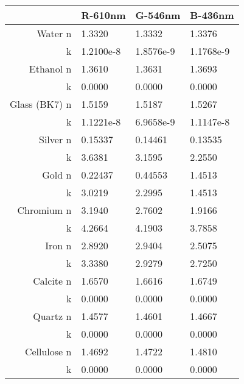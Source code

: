\documentclass[english,10pt,a4paper,twocolumn,colorscheme=green]{orarticle}
\begin{document}
	\begin{tabular}{|r|l|l|l|}
		\hline
		& R-610nm & G-546nm & B-436nm\\
		\hline
		Water n & 1.3320 & 1.3332 & 1.3376\\
		k & 1.2100e-8 & 1.8576e-9 & 1.1768e-9\\
		\hline
		Ethanol n & 1.3610 & 1.3631 & 1.3693\\
		k & 0.0000 & 0.0000 & 0.0000\\
		\hline
		Glass (BK7) n & 1.5159 & 1.5187 & 1.5267\\
		k & 1.1221e-8 & 6.9658e-9 & 1.1147e-8\\
		\hline
		Silver n & 0.15337 & 0.14461 & 0.13535\\
		k & 3.6381 & 3.1595 & 2.2550\\
		\hline
		Gold n & 0.22437 & 0.44553 & 1.4513\\
		k & 3.0219 & 2.2995 & 1.4513\\
		\hline
		Chromium n & 3.1940 & 2.7602 & 1.9166\\
		k & 4.2664 & 4.1903 & 3.7858\\
		\hline
		Iron n & 2.8920 & 2.9404 & 2.5075\\
		k & 3.3380 & 2.9279 & 2.7250\\
		\hline
		Calcite n & 1.6570 & 1.6616 & 1.6749\\
		k & 0.0000 & 0.0000 & 0.0000\\
		\hline
		Quartz n & 1.4577 & 1.4601 & 1.4667\\
		k & 0.0000 & 0.0000 & 0.0000\\
		\hline
		Cellulose n & 1.4692 & 1.4722 & 1.4810\\
		k & 0.0000 & 0.0000 & 0.0000\\
		\hline
	\end{tabular}
\end{document}
